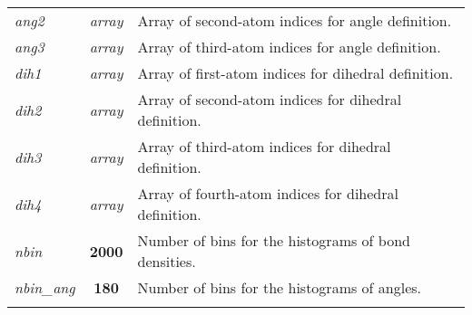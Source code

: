 \documentclass[12pt,a4paper]{article}
\begin{document}
\begin{tabular}{lcp{13cm}}
\textit{ang2} & \textit{array} & Array of second-atom indices for angle definition.\\
\textit{ang3} & \textit{array} & Array of third-atom indices for angle definition.\\

\textit{dih1} & \textit{array} & Array of first-atom indices for dihedral definition.\\
\textit{dih2} & \textit{array} & Array of second-atom indices for dihedral definition.\\
\textit{dih3} & \textit{array} & Array of third-atom indices for dihedral definition.\\
\textit{dih4} & \textit{array} & Array of fourth-atom indices for dihedral definition.\\


\colorbox{black!20}{ \textit{nbin} }& \textbf{2000} & Number of bins for the histograms of bond densities. \\
\colorbox{black!20}{\textit{nbin\_ang}} & \textbf{180} & Number of bins for the histograms of angles. \\
& & \\

\hline
\end{tabular}

\newpage
\end{document}
